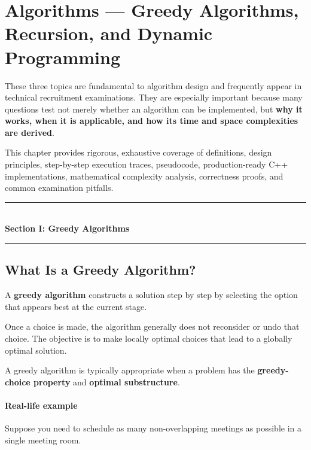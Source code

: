 \chapter{Algorithms --- Greedy Algorithms, Recursion, and Dynamic Programming}
\label{ch:greedy_recursion_dp}

These three topics are fundamental to algorithm design and frequently appear in technical recruitment examinations. They are especially important because many questions test not merely whether an algorithm can be implemented, but \textbf{why it works, when it is applicable, and how its time and space complexities are derived}.

This chapter provides rigorous, exhaustive coverage of definitions, design principles, step-by-step execution traces, pseudocode, production-ready C++ implementations, mathematical complexity analysis, correctness proofs, and common examination pitfalls.


\begin{center}
\vspace{0.5em}
{\color{primary}\rule{0.45\textwidth}{1.2pt}}\\[4pt]
{\Large\bfseries\color{primary} Section I: Greedy Algorithms}\\[2pt]
{\color{primary}\rule{0.45\textwidth}{1.2pt}}
\vspace{0.5em}
\end{center}


\section{What Is a Greedy Algorithm?}

A \textbf{greedy algorithm} constructs a solution step by step by selecting the option that appears best at the current stage.

Once a choice is made, the algorithm generally does not reconsider or undo that choice. The objective is to make locally optimal choices that lead to a globally optimal solution.

A greedy algorithm is typically appropriate when a problem has the \textbf{greedy-choice property} and \textbf{optimal substructure}.

\subsubsection{Real-life example}

Suppose you need to schedule as many non-overlapping meetings as possible in a single meeting room.

